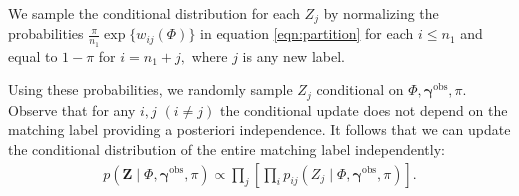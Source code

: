 \documentclass[ba]{imsart}
\newcommand{\bZ}{\boldsymbol{Z}}
\newcommand{\bgamma}{\boldsymbol{\gamma}}
\begin{document}
We sample the conditional distribution for each $Z_j$ by normalizing the probabilities $\frac{\pi}{n_1} \exp \{ w_{ij}(\Phi) \}$ in equation \ref{eqn:partition} for each $i \leq n_1$ and equal to $1-\pi$ for $i = n_1 + j,$ where $j$ is any new label. 

Using these probabilities, we randomly sample $Z_j$ conditional on $\Phi, \bgamma^{\text{obs}}, \pi.$ Observe that for any $i, j$ $(i \neq j)$ the conditional update does not depend on the matching label providing a posteriori independence. It follows that we can update the conditional distribution of the entire matching label independently:
\begin{align}
p(\bZ \mid \Phi, \bgamma^{\text{obs}}, \pi) \propto \prod_j \left[ \prod_i p_{ij} (Z_{j} \mid \Phi, \bgamma^{\text{obs}}, \pi) \right].
\end{align}
\end{document}

